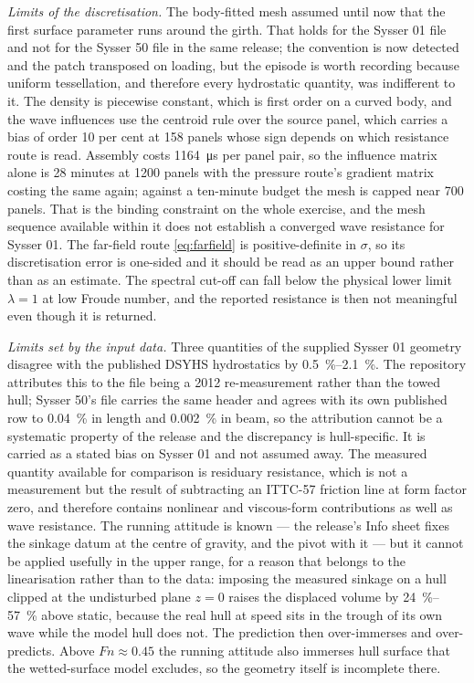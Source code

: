 \documentclass[11pt]{article}
\newcommand{\Fn}{\mathit{Fn}}
\begin{document}
\textit{Limits of the discretisation.} The body-fitted mesh assumed until now that the
first surface parameter runs around the girth. That holds for the Sysser 01 file and not for
the Sysser 50 file in the same release; the convention is now detected and the patch
transposed on loading, but the episode is worth recording because uniform tessellation, and
therefore every hydrostatic quantity, was indifferent to it. The density is piecewise
constant, which is first order on a curved body, and the wave influences use the centroid rule over the source
panel, which carries a bias of order 10 per cent at 158 panels whose sign depends on which
resistance route is read. Assembly costs \SI{1164}{\micro\second} per panel pair, so the
influence matrix alone is 28 minutes at 1200 panels with the pressure route's gradient
matrix costing the same again; against a ten-minute budget the mesh is capped near 700
panels. That is the binding constraint on the whole exercise, and the mesh sequence
available within it does not establish a converged wave resistance for Sysser 01. The
far-field route \eqref{eq:farfield} is positive-definite in $\sigma$, so its
discretisation error is one-sided and it should be read as an upper bound rather than as an
estimate. The spectral cut-off can fall below the physical lower limit $\lambda = 1$ at low
Froude number, and the reported resistance is then not meaningful even though it is
returned.

\textit{Limits set by the input data.} Three quantities of the supplied Sysser 01 geometry
disagree with the published DSYHS hydrostatics by \SIrange{0.5}{2.1}{\percent}. The
repository attributes this to the file being a 2012 re-measurement rather than the towed
hull; Sysser 50's file carries the same header and agrees with its own published row to
\SI{0.04}{\percent} in length and \SI{0.002}{\percent} in beam, so the attribution cannot
be a systematic property of the release and the discrepancy is hull-specific. It is carried
as a stated bias on Sysser 01 and not assumed away. The measured quantity available for comparison is
residuary resistance, which is not a measurement but the result of subtracting an ITTC-57
friction line at form factor zero, and therefore contains nonlinear and viscous-form
contributions as well as wave resistance. The running attitude is known --- the release's Info
sheet fixes the sinkage datum at the centre of gravity, and the pivot with it --- but it
cannot be applied usefully in the upper range, for a reason that belongs to the
linearisation rather than to the data: imposing the measured sinkage on a hull clipped at
the undisturbed plane $z = 0$ raises the displaced volume by \SIrange{24}{57}{\percent} above static, because the real hull
at speed sits in the trough of its own wave while the model hull does not. The prediction
then over-immerses and over-predicts. Above $\Fn \approx 0.45$ the running attitude also
immerses hull surface that the wetted-surface model excludes, so the geometry itself is
incomplete there.
\end{document}
